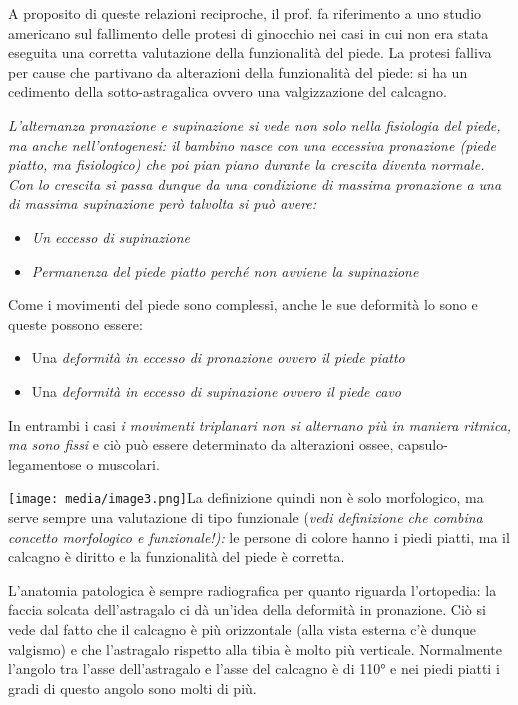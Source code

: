 \documentclass[]{article}
\begin{document}
A proposito di queste relazioni reciproche, il prof. fa riferimento a
uno studio americano sul fallimento delle protesi di ginocchio nei casi
in cui non era stata eseguita una corretta valutazione della
funzionalità del piede. La protesi falliva per cause che partivano da
alterazioni della funzionalità del piede: si ha un cedimento della
sotto-astragalica ovvero una valgizzazione del calcagno.

\emph{L'alternanza pronazione e supinazione si vede non solo nella
fisiologia del piede, ma anche nell'ontogenesi: il bambino nasce con una
eccessiva pronazione (piede piatto, ma fisiologico) che poi pian piano
durante la crescita diventa normale. Con lo crescita si passa dunque da
una condizione di massima pronazione a una di massima supinazione però
talvolta si può avere:}

\begin{itemize}
\item
  \emph{Un eccesso di supinazione}
\item
  \emph{Permanenza del piede piatto perché non avviene la supinazione}
\end{itemize}

Come i movimenti del piede sono complessi, anche le sue deformità lo
sono e queste possono essere:

\begin{itemize}
\item
  Una \emph{deformità in eccesso di pronazione ovvero il piede piatto}
\end{itemize}

\begin{itemize}
\item
  Una \emph{deformità in eccesso di supinazione} \emph{ovvero il piede
  cavo}
\end{itemize}

In entrambi i casi \emph{i movimenti triplanari non si alternano più in
maniera ritmica, ma sono fissi} e ciò può essere determinato da
alterazioni ossee, capsulo-legamentose o muscolari.

\texttt{[image: media/image3.png]}La
definizione quindi non è solo morfologico, ma serve sempre una
valutazione di tipo funzionale (\emph{vedi definizione che combina
concetto morfologico e funzionale!):} le persone di colore hanno i piedi
piatti, ma il calcagno è diritto e la funzionalità del piede è corretta.

L'anatomia patologica è sempre radiografica per quanto riguarda
l'ortopedia: la faccia solcata dell'astragalo ci dà un'idea della
deformità in pronazione. Ciò si vede dal fatto che il calcagno è più
orizzontale (alla vista esterna c'è dunque valgismo) e che l'astragalo
rispetto alla tibia è molto più verticale. Normalmente l'angolo tra
l'asse dell'astragalo e l'asse del calcagno è di 110° e nei piedi piatti
i gradi di questo angolo sono molti di più.
\end{document}
